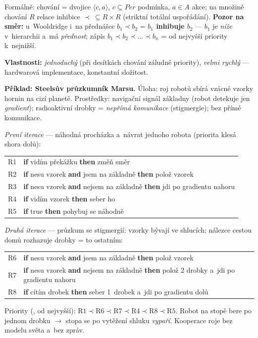 \documentclass[11pt,a4paper]{article}
\theoremstyle{definition}
\begin{document}
Formálně: chování = dvojice $\langle c, a\rangle$, $c \subseteq \mathit{Per}$ podmínka,
$a \in A$ akce; na množině chování $R$ relace inhibice $\prec\ \subseteq R \times R$
(striktní totální uspořádání). \textbf{Pozor na směr:} u~Wooldridge i~na přednášce
$b_1 \prec b_2$ = \textbf{$b_1$ inhibuje $b_2$} --- $b_1$ je \emph{níže} v~hierarchii a~má
\emph{přednost}; zápis $b_1 \prec b_2 \prec \dots \prec b_n$ = od nejvyšší priority
k~nejnižší.

\textbf{Vlastnosti:} \emph{jednoduchý} (při desítkách chování záludné priority),
\emph{velmi rychlý} --- hardwarová implementace, konstantní složitost.

\medskip
\noindent\textbf{Příklad: Steelsův průzkumník Marsu.}
Úloha: roj robotů sbírá vzácné vzorky hornin na cizí planetě. Prostředky: navigační signál
základny (robot detekuje jen \emph{gradient}); radioaktivní drobky = \emph{nepřímá
komunikace} (stigmergie); bez přímé komunikace.

\emph{První iterace} --- náhodná procházka a~návrat jednoho robota (priorita klesá shora dolů):
\begin{center}\small
\begin{tabular}{ll}
\toprule
R1 & \textbf{if} vidím překážku \textbf{then} změň směr \\
R2 & \textbf{if} nesu vzorek \textbf{and} jsem na základně \textbf{then} polož vzorek \\
R3 & \textbf{if} nesu vzorek \textbf{and} nejsem na základně \textbf{then} jdi po gradientu nahoru \\
R4 & \textbf{if} vidím vzorek \textbf{then} seber ho \\
R5 & \textbf{if} true \textbf{then} pohybuj se náhodně \\
\bottomrule
\end{tabular}
\end{center}

\emph{Druhá iterace} --- průzkum se stigmergií: vzorky bývají ve shlucích; nálezce cestou domů
rozhazuje drobky =  to ostatním:
\begin{center}\small
\begin{tabular}{ll}
\toprule
R6 & \textbf{if} nesu vzorek \textbf{and} jsem na základně \textbf{then} polož vzorek \\
R7 & \textbf{if} nesu vzorek \textbf{and} nejsem na základně \textbf{then} polož 2 drobky
     a~jdi po gradientu nahoru \\
R8 & \textbf{if} cítím drobek \textbf{then} seber 1~drobek a~jdi po gradientu dolů \\
\bottomrule
\end{tabular}
\end{center}
Priority (, od nejvyšší):
$\mathrm{R1} \prec \mathrm{R6} \prec \mathrm{R7} \prec \mathrm{R4} \prec
\mathrm{R8} \prec \mathrm{R5}$. Robot na stopě bere po jednom drobku $\to$ stopa se po
vytěžení shluku \emph{vypaří}. Kooperace roje bez modelu světa a~bez zpráv.
\end{document}
